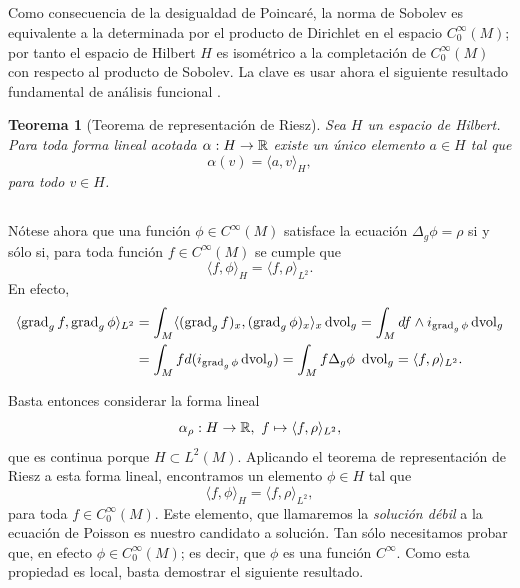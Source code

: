 \documentclass[11pt,a4paper]{amsbook}
\newtheorem{thm}[subsection]{Teorema}
\theoremstyle{remark} \newtheorem{rmk}[subsection]{Observación}
\theoremstyle{definition} \newtheorem{defn}[subsection]{Definición}
\theoremstyle{definition} \newtheorem{ex}[subsection]{Ejemplo}
\theoremstyle{definition} \newtheorem{ej}[subsection]{Ejercicio}
\begin{document}
\subsection{} Como consecuencia de la desigualdad de Poincaré, la norma de Sobolev es equivalente a la determinada por el producto de Dirichlet en el espacio $C^\infty_0(M)$; por tanto el espacio de Hilbert $H$ es isométrico a la completación de $C^\infty_0(M)$ con respecto al producto de Sobolev. La clave es usar ahora el siguiente resultado fundamental de análisis funcional .


\begin{thm}[Teorema de representación de Riesz]
Sea $H$ un espacio de Hilbert. Para toda forma lineal acotada $\alpha:H\rightarrow \mathbb R$ existe un único elemento $a\in H$ tal que
\begin{equation*}
\alpha(v) = \langle a, v\rangle_H,
\end{equation*}
para todo $v\in H$.
\end{thm}

\subsection{} Nótese ahora que una función $\phi \in C^\infty(M)$ satisface la ecuación $\Delta_g \phi = \rho$ si y sólo si, para toda función $f\in C^\infty(M)$ se cumple que
\begin{equation*}
\langle f,\phi \rangle_{H} = \langle f, \rho \rangle_{L^2}.
\end{equation*}
En efecto,
\begin{align*}
\langle \operatorname{grad}_g f, \operatorname{grad}_g \phi \rangle_{L^2} &= \int_{M}\langle (\operatorname{grad}_g f)_x, (\operatorname{grad}_g \phi)_x \rangle_x \operatorname{dvol}_g = \int_{M} df \wedge i_{\operatorname{grad}_g \phi} \operatorname{dvol}_g \\ &= \int_M f d(i_{\operatorname{grad}_g \phi} \operatorname{dvol}_g) = \int_M f \Delta_g \phi\ \operatorname{dvol}_g= \langle f, \rho \rangle_{L^2}.
\end{align*}

Basta entonces considerar la forma lineal
\begin{equation*}
\alpha_\rho: H \rightarrow \mathbb R,\ f \mapsto \langle f, \rho \rangle_{L^2},
\end{equation*}
que es continua porque $H\subset L^2(M)$. Aplicando el teorema de representación de Riesz a esta forma lineal, encontramos un elemento $\phi\in H$ tal que
\begin{equation*}
\langle f, \phi \rangle_H = \langle f, \rho \rangle_{L^2},
\end{equation*}
para toda $f\in C^\infty_0(M)$. Este elemento, que llamaremos la \emph{solución débil} a la ecuación de Poisson es nuestro candidato a solución. Tan sólo necesitamos probar que, en efecto $\phi \in C^\infty_0(M)$; es decir, que $\phi$ es una función $C^\infty$. Como esta propiedad es local, basta demostrar el siguiente resultado.
\end{document}
